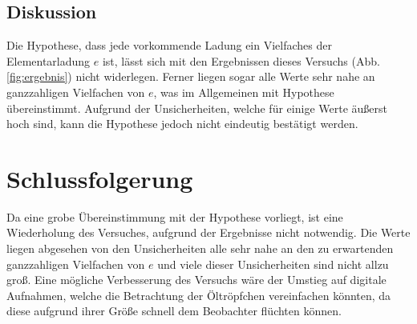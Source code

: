 \subsection{Diskussion}

Die Hypothese, dass jede vorkommende Ladung ein Vielfaches der Elementarladung $e$ ist, lässt sich mit den Ergebnissen dieses Versuchs (Abb. \ref{fig:ergebnis}) nicht widerlegen.
Ferner liegen sogar alle Werte sehr nahe an ganzzahligen Vielfachen von $e$, was im Allgemeinen mit Hypothese übereinstimmt.
Aufgrund der Unsicherheiten, welche für einige Werte äußerst hoch sind, kann die Hypothese jedoch nicht eindeutig bestätigt werden. 

\section{Schlussfolgerung}

Da eine grobe Übereinstimmung mit der Hypothese vorliegt, ist eine Wiederholung des Versuches, aufgrund der Ergebnisse nicht notwendig.
Die Werte liegen abgesehen von den Unsicherheiten alle sehr nahe an den zu erwartenden ganzzahligen Vielfachen von $e$ und viele dieser Unsicherheiten sind nicht allzu groß.
Eine mögliche Verbesserung des Versuchs wäre der Umstieg auf digitale Aufnahmen, welche die Betrachtung der Öltröpfchen vereinfachen könnten, da diese aufgrund ihrer Größe schnell dem Beobachter flüchten können. 
